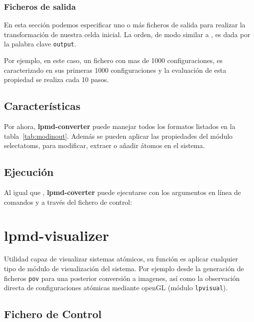 \subsubsection{Ficheros de salida}
En esta secci\'on podemos especificar uno o m\'as ficheros de salida para realizar la transformaci\'on de nuestra celda inicial. La orden, de modo similar a {\lpmd}, es dada por la palabra clave \verb|output|.


Por ejemplo, en este caso, un fichero con mas de 1000 configuraciones, es caracterizado en sus primeras 1000 configuraciones y la evaluaci\'on de esta propiedad se realiza cada 10 pasos.


\subsection{Caracter\'isticas}
Por ahora, \textbf{lpmd-converter} puede manejar todos los formatos listados en la tabla~\ref{tab:modinout}. Adem\'as se pueden aplicar las propiedades del m\'odulo selectatoms, para modificar, extraer o a\~nadir \'atomos en el sistema.

\subsection{Ejecuci\'on}
Al igual que {\lpmd}, \textbf{lpmd-coverter} puede ejecutarse con los argumentos en l\'inea de comandos y a trav\'es del fichero de control:


\section{lpmd-visualizer}
Utilidad capaz de visualizar sistemas at\'omicos, su funci\'on es aplicar cualquier tipo de m\'odulo de visualizaci\'on del sistema. Por ejemplo desde la generaci\'on de ficheros \verb|pov| para una posterior conversi\'on a imagenes, as\'i como la observaci\'on directa de configuraciones at\'omicas mediante openGL (m\'odulo \verb|lpvisual|).

\subsection{Fichero de Control}

